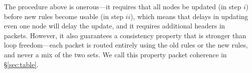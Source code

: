 

The procedure above is onerous---it requires that all nodes be updated (in step $i$) before new rules become usable (in step $ii$), which means that delays in updating even one node will delay the update, and it requires additional headers in packets. However, it also guarantees a consistency property that is stronger than loop freedom---each packet is routed entirely using the old rules or the new rules, and never a mix of the two sets. We call this property packet coherence in \S\ref{sec:table}.

